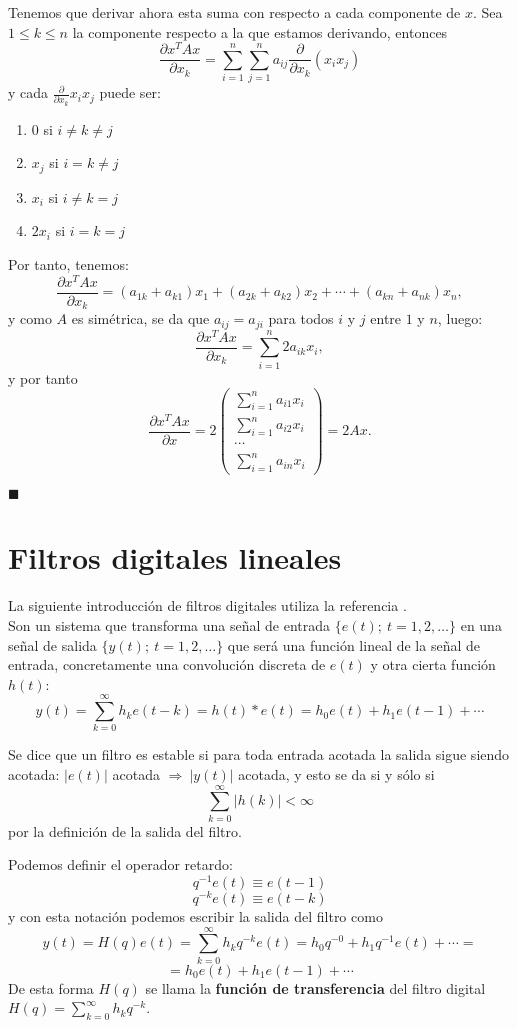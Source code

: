 Tenemos que derivar ahora esta suma con respecto a cada componente de $x$. Sea $1 \leq k \leq n$ la componente respecto a la que estamos derivando, entonces 
\[	\frac{\partial x^TAx}{\partial x_k} = \sum_{i=1}^n \sum_{j=1}^n a_{ij} \frac{\partial}{\partial x_k} (x_ix_j)	\]
y cada $\frac{\partial}{\partial x_k} x_ix_j$ puede ser:
\begin{enumerate}
\item 0 si $i \neq k \neq j$
\item $x_j$ si $i = k \neq j$
\item $x_i$ si $ i \neq k = j$
\item $2x_i$ si $i = k = j$
\end{enumerate}

Por tanto, tenemos:
\[	\frac{\partial x^TAx}{\partial x_k} = (a_{1k} + a_{k1})x_1 + (a_{2k} + a_{k2})x_2 + \cdots + (a_{kn}+a_{nk})x_n,	\]
y como $A$ es simétrica, se da que $a_{ij} = a_{ji}$ para todos $i$ y $j$ entre $1$ y $n$, luego:
\[	\frac{\partial x^TAx}{\partial x_k} = \sum_{i=1}^n 2a_{ik}x_i,	\]
y por tanto
\[	\frac{\partial x^TAx}{\partial x} = 2
\left( \begin{array}{c}
\sum_{i=1}^n a_{i1}x_i \\
\sum_{i=1}^n a_{i2}x_i \\
\cdots \\
\sum_{i=1}^n a_{in}x_i \end{array} \right) = 2Ax.	\]
\begin{flushright}
$\blacksquare$
\end{flushright}

\section{Filtros digitales lineales}
La siguiente introducción de filtros digitales utiliza la referencia \cite{lennart}.\\

Son un sistema que transforma una señal de entrada $\{e(t);\ t=1,2,\dots\}$ en una señal de salida $\{y(t);\ t=1,2,\dots \}$ que será una función lineal de la señal de entrada, concretamente una convolución discreta de $e(t)$ y otra cierta función $h(t)$:
\[	y(t) = \sum_{k=0}^{\infty} h_k e(t-k) = h(t) \ast e(t) = h_0 e(t) + h_1 e(t-1) + \cdots	\]

\begin{definicion}
Se dice que un filtro es estable si para toda entrada acotada la salida sigue siendo acotada: $|e(t)|$ acotada $\Rightarrow \ |y(t)|$ acotada, y esto se da si y sólo si
\[ \sum_{k=0}^{\infty} |h(k)| < \infty 	\]
por la definición de la salida del filtro.
\end{definicion}

\begin{nota}
Podemos definir el operador retardo:
\[	q^{-1}e(t) \equiv e(t-1)	\]
\[	q^{-k}e(t) \equiv e(t-k)	\]
y con esta notación podemos escribir la salida del filtro como
\[	y(t) = H(q)e(t) = \sum_{k=0}^{\infty} h_k q^{-k} e(t) = h_0q^{-0}+h_1q^{-1}e(t)+ \cdots = \]
\[ = h_0e(t) + h_1e(t-1) + \cdots	\]
De esta forma $H(q)$ se llama la \textbf{función de transferencia} del filtro digital $H(q) = \sum_{k=0}^{\infty} h_k q^{-k}$.
\end{nota}